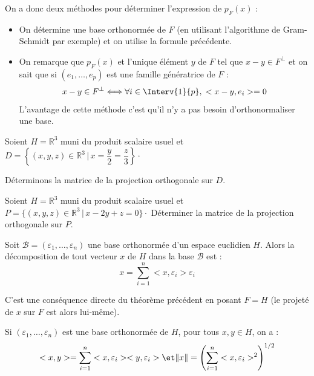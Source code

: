 \documentclass[a4paper,10pt]{report}
\begin{document}
\noindent On a donc deux méthodes pour déterminer l'expression de $p_F(x)$ :
\begin{itemize}
\item On détermine une base orthonormée de $F$ (en utilisant l'algorithme de Gram-Schmidt par exemple) et on utilise la formule précédente.
\item On remarque que $p_F(x)$ et l'unique élément $y$ de $F$ tel que $x-y \in F^{\perp}$ et on sait que si $(e_1, \ldots, e_p)$ est une famille génératrice de $F$ :
$$ x-y \in F^{\perp} \Longleftrightarrow \forall i \in \Interv{1}{p}, \; <x-y, e_i>=0 $$
L'avantage  de cette méthode c'est qu'il n'y a pas besoin d'orthonormaliser une base.
\end{itemize}

\begin{ex} Soient $H= \mathbb{R}^3$ muni du produit scalaire usuel et $D= \left\lbrace (x,y,z) \in \mathbb{R}^3 \, \vert \, x= \dfrac{y}{2} = \dfrac{z}{3} \right\rbrace \cdot$

\noindent Déterminons la matrice de la projection orthogonale sur $D$.

\vspace{10cm}
\end{ex}

\newpage


\begin{exa} Soient $H= \mathbb{R}^3$ muni du produit scalaire usuel et $P = \lbrace (x,y,z) \in \mathbb{R}^3 \, \vert \, x-2y+z=0 \rbrace \cdot$
Déterminer la matrice de la projection orthogonale sur $P$.
\end{exa}

\begin{prop} Soit $\mathcal{B}= (\varepsilon_1, \ldots, \varepsilon_n)$ une base orthonormée d'un espace euclidien $H$. Alors la décomposition de tout vecteur $x$ de $H$ dans la base $\mathcal{B}$ est :
$$ x = \sum_{i=1}^n <x, \varepsilon_i> \varepsilon_i $$
\end{prop}

\begin{preuve} C'est une conséquence directe du théorème précédent en posant $F=H$ (le projeté de $x$ sur $F$ est alors lui-même).
\end{preuve}

\begin{rem} Si $(\varepsilon_1, \ldots, \varepsilon_n)$ est une base orthonormée de $H$, pour tous $x,y \in H$, on a :
$$ <x,y> = \sum_{i=1}^n <x,\varepsilon_i><y,\varepsilon_i> \et \Vert x \Vert = \left(\sum_{i=1}^n <x,\varepsilon_i>^2 \right)^{1/2}$$
\end{rem}
\end{document}
